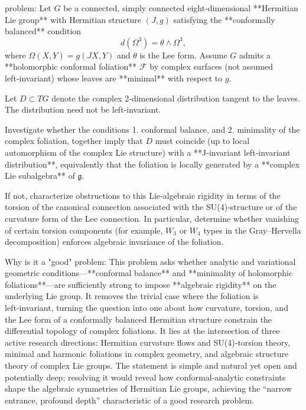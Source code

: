 problem:  
Let \(G\) be a connected, simply connected eight‑dimensional **Hermitian Lie group** with Hermitian structure \((J,g)\) satisfying the **conformally balanced** condition  
\[
d(\Omega^{3}) = \theta \wedge \Omega^{3},
\]
where \(\Omega(X,Y)=g(JX,Y)\) and \(\theta\) is the Lee form.  
Assume \(G\) admits a **holomorphic conformal foliation** \(\mathcal{F}\) by complex surfaces (not assumed left‑invariant) whose leaves are **minimal** with respect to \(g\).  

Let \(D\subset TG\) denote the complex 2‑dimensional distribution tangent to the leaves. The distribution need not be left‑invariant.  

Investigate whether the conditions  
1. conformal balance, and  
2. minimality of the complex foliation,  
together imply that \(D\) must coincide (up to local automorphism of the complex Lie structure) with a **J‑invariant left‑invariant distribution**, equivalently that the foliation is locally generated by a **complex Lie subalgebra** of \(\mathfrak{g}\).  

If not, characterize obstructions to this Lie‑algebraic rigidity in terms of the torsion of the canonical connection associated with the SU(4)‑structure or of the curvature form of the Lee connection. In particular, determine whether vanishing of certain torsion components (for example, \(W_3\) or \(W_4\) types in the Gray–Hervella decomposition) enforces algebraic invariance of the foliation.  

Why is it a "good" problem:  
This problem asks whether analytic and variational geometric conditions—**conformal balance** and **minimality of holomorphic foliations**—are sufficiently strong to impose **algebraic rigidity** on the underlying Lie group. It removes the trivial case where the foliation is left‑invariant, turning the question into one about how curvature, torsion, and the Lee form of a conformally balanced Hermitian structure constrain the differential topology of complex foliations.  
It lies at the intersection of three active research directions: Hermitian curvature flows and SU(4)‑torsion theory, minimal and harmonic foliations in complex geometry, and algebraic structure theory of complex Lie groups. The statement is simple and natural yet open and potentially deep; resolving it would reveal how conformal‑analytic constraints shape the algebraic symmetries of Hermitian Lie groups, achieving the “narrow entrance, profound depth” characteristic of a good research problem.
